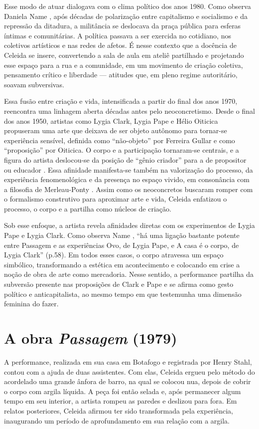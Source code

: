 Esse modo de atuar dialogava com o clima político dos anos 1980. Como observa Daniela Name \citeyear{nameLamaAoCaos2014}, após décadas de polarização entre capitalismo e socialismo e da repressão da ditadura, a militância se deslocava da praça pública para esferas íntimas e comunitárias. A política passava a ser exercida no cotidiano, nos coletivos artísticos e nas redes de afetos. É nesse contexto que a docência de Celeida se insere, convertendo a sala de aula em ateliê partilhado e projetando esse espaço para a rua e a comunidade, em um movimento de criação coletiva, pensamento crítico e liberdade — atitudes que, em pleno regime autoritário, soavam subversivas.

Essa fusão entre criação e vida, intensificada a partir do final dos anos 1970, reencontra uma linhagem aberta décadas antes pelo neoconcretismo. Desde o final dos anos 1950, artistas como Lygia Clark, Lygia Pape e Hélio Oiticica propuseram uma arte que deixava de ser objeto autônomo para tornar-se experiência sensível, definida como “não-objeto” por Ferreira Gullar e como “proposição” por Oiticica. O corpo e a participação tornaram-se centrais, e a figura do artista deslocou-se da posição de “gênio criador” para a de propositor ou educador \parencite{caysesIstoNaoUma2014}. Essa afinidade manifesta-se também na valorização do processo, da experiência fenomenológica e da presença no espaço vivido, em consonância com a filosofia de Merleau-Ponty \parencite{gullarManifestoNeoconcreto1959}. Assim como os neoconcretos buscaram romper com o formalismo construtivo para aproximar arte e vida, Celeida enfatizou o processo, o corpo e a partilha como núcleos de criação.

Sob esse enfoque, a artista revela afinidades diretas com os experimentos de Lygia Pape e Lygia Clark. Como observa Name \citeyear{nameLamaAoCaos2014}, “há uma ligação bastante potente entre Passagem e as experiências Ovo, de Lygia Pape, e A casa é o corpo, de Lygia Clark” (p.58). Em todos esses casos, o corpo atravessa um espaço simbólico, transformando a estética em acontecimento e colocando em crise a noção de obra de arte como mercadoria. Nesse sentido, a performance partilha da subversão presente nas proposições de Clark e Pape e se afirma como gesto político e anticapitalista, ao mesmo tempo em que testemunha uma dimensão feminina do fazer.

\section*{A obra \emph{Passagem} (1979)}
A performance, realizada em sua casa em Botafogo e registrada por Henry Stahl, contou com a ajuda de duas assistentes. Com elas, Celeida ergueu pelo método do acordelado uma grande ânfora de barro, na qual se colocou nua, depois de cobrir o corpo com argila líquida. A peça foi então selada e, após permanecer algum tempo em seu interior, a artista rompeu as paredes e deslizou para fora. Em relatos posteriores, Celeida afirmou ter sido transformada pela experiência, inaugurando um período de aprofundamento em sua relação com a argila.

